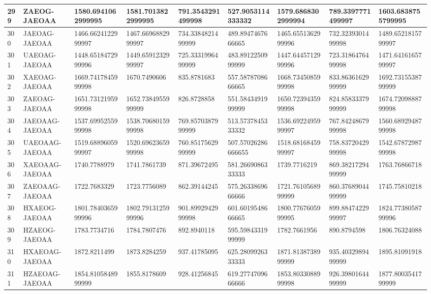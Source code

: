 {\begin{longtable}{|l|l|l|l|l|l|l|l|l|}
        299 & ZAEOG-JAEOAA & 1580.6941062999995 & 1581.7013822999995 & 791.3543291499998 & 527.9053114333332 & 1579.6868302999994 & 789.3397771499997 & 1603.6838755799995 \\ \hline
        300 & JAEOAG-JAEOAA & 1466.6624122999997 & 1467.6696882999997 & 734.3384821499999 & 489.8947467666665 & 1465.6551362999996 & 732.3239301499998 & 1489.6521815799997 \\ \hline
        301 & UAEOAG-JAEOAA & 1448.6518472999996 & 1449.6591232999997 & 725.3331996499999 & 483.8912250999999 & 1447.6445712999996 & 723.3186476499998 & 1471.6416165799997 \\ \hline
        302 & XAEOAG-JAEOAA & 1669.7417845999998 & 1670.7490606 & 835.8781683 & 557.5878708666665 & 1668.7345085999998 & 833.8636162999999 & 1692.7315538799999 \\ \hline
        303 & ZAEOAG-JAEOAA & 1651.7312195999998 & 1652.7384955999999 & 826.8728858 & 551.5843491999999 & 1650.7239435999998 & 824.8583337999999 & 1674.7209888799998 \\ \hline
        304 & JAEOAAG-JAEOAA & 1537.6995255999998 & 1538.7068015999998 & 769.8570387999999 & 513.5737845333332 & 1536.6922495999997 & 767.8424867999998 & 1560.6892948799998 \\ \hline
        305 & UAEOAAG-JAEOAA & 1519.6889605999997 & 1520.6962365999998 & 760.8517562999999 & 507.57026286666655 & 1518.6816845999997 & 758.8372042999998 & 1542.6787298799998 \\ \hline
        306 & XAEOAAG-JAEOAA & 1740.7788979 & 1741.7861739 & 871.39672495 & 581.2669086333333 & 1739.7716219 & 869.3821729499999 & 1763.76866718 \\ \hline
        307 & ZAEOAAG-JAEOAA & 1722.7683329 & 1723.7756089 & 862.39144245 & 575.2633869666666 & 1721.7610568999999 & 860.3768904499999 & 1745.75810218 \\ \hline
        308 & HXAEOG-JAEOAA & 1801.7840365999996 & 1802.7913125999996 & 901.8992942999998 & 601.6019548666665 & 1800.7767605999995 & 899.8847422999997 & 1824.7738058799996 \\ \hline
        309 & HZAEOG-JAEOAA & 1783.7734716 & 1784.7807476 & 892.8940118 & 595.5984331999999 & 1782.7661956 & 890.8794598 & 1806.76324088 \\ \hline
        310 & HXAEOAG-JAEOAA & 1872.8211499 & 1873.8284259 & 937.41785095 & 625.2809926333333 & 1871.8138738999999 & 935.4032989499999 & 1895.81091918 \\ \hline
        311 & HZAEOAG-JAEOAA & 1854.8105848999999 & 1855.8178609 & 928.41256845 & 619.2774709666666 & 1853.8033088999998 & 926.3980164499999 & 1877.8003541799999 \\ \hline

\end{longtable}}
